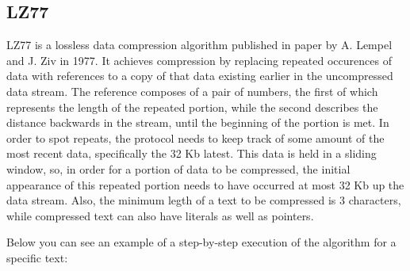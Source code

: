 \subsection{LZ77} LZ77 is a lossless data compression algorithm published in
paper by A. Lempel and J. Ziv in 1977. \cite{lz77} It achieves compression by
replacing repeated occurences of data with references to a copy of that data
existing earlier in the uncompressed data stream. The reference composes of a
pair of numbers, the first of which represents the length of the repeated
portion, while the second describes the distance backwards in the stream, until
the beginning of the portion is met. In order to spot repeats, the protocol
needs to keep track of some amount of the most recent data, specifically the 32
Kb latest. This data is held in a sliding window, so, in order for a portion of
data to be compressed, the initial appearance of this repeated portion needs to
have occurred at most 32 Kb up the data stream. Also, the minimum legth of a
text to be compressed is 3 characters, while compressed text can also have
literals as well as pointers.

Below you can see an example of a step-by-step execution of the algorithm for a
specific text:

